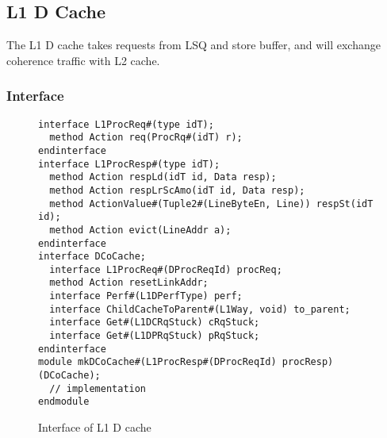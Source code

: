 \subsection{L1 D Cache}

The L1 D cache takes requests from LSQ and store buffer, and will exchange coherence traffic with L2 cache.

\subsubsection{Interface}

\begin{figure}
\begin{lstlisting}[caption={}]
interface L1ProcReq#(type idT);
  method Action req(ProcRq#(idT) r);
endinterface
interface L1ProcResp#(type idT);
  method Action respLd(idT id, Data resp);
  method Action respLrScAmo(idT id, Data resp);
  method ActionValue#(Tuple2#(LineByteEn, Line)) respSt(idT id);
  method Action evict(LineAddr a);
endinterface
interface DCoCache;
  interface L1ProcReq#(DProcReqId) procReq;
  method Action resetLinkAddr;
  interface Perf#(L1DPerfType) perf;
  interface ChildCacheToParent#(L1Way, void) to_parent;
  interface Get#(L1DCRqStuck) cRqStuck;
  interface Get#(L1DPRqStuck) pRqStuck;
endinterface
module mkDCoCache#(L1ProcResp#(DProcReqId) procResp)(DCoCache);
  // implementation
endmodule
\end{lstlisting}
\caption{Interface of L1 D cache}
\end{figure}